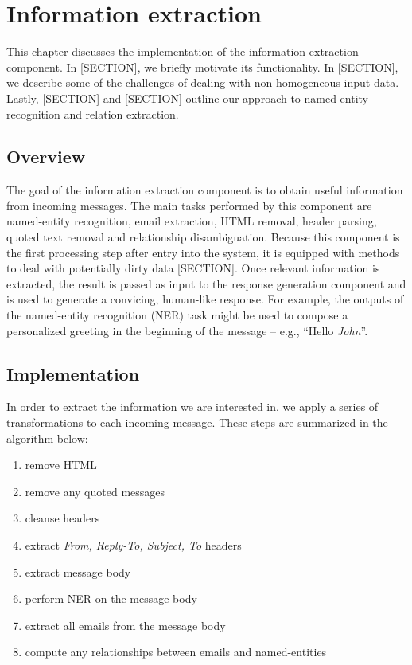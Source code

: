 \chapter{Information extraction}
This chapter discusses the implementation of the information extraction component. In [SECTION], we briefly motivate its functionality. In [SECTION], we describe some of the challenges of dealing with non-homogeneous input data. Lastly, [SECTION] and [SECTION] outline our approach to named-entity recognition and relation extraction.

\section{Overview}
The goal of the information extraction component is to obtain useful information from incoming messages. The main tasks performed by this component are named-entity recognition, email extraction, HTML removal, header parsing, quoted text removal and relationship disambiguation. Because this component is the first processing step after entry into the system, it is equipped with methods to deal with potentially dirty data [SECTION]. Once relevant information is extracted, the result is passed as input to the response generation component and is used to generate a convicing, human-like response. For example, the outputs of the named-entity recognition (NER) task might be used to compose a personalized greeting in the beginning of the message -- e.g., ``Hello \emph{John}''.

\section{Implementation}
In order to extract the information we are interested in, we apply a series of transformations to each incoming message. These steps are summarized in the algorithm below:
\begin{enumerate}
\item remove HTML %
\vspace{-5mm}
\item remove any quoted messages %
\vspace{-5mm}
\item cleanse headers %
\vspace{-5mm}
\item extract \textit{From, Reply-To, Subject, To} headers %
\vspace{-5mm}
\item extract message body %
\vspace{-5mm}
\item perform NER on the message body %
\vspace{-5mm}
\item extract all emails from the message body %
\vspace{-5mm}
\item compute any relationships between emails and named-entities %
\end{enumerate}

